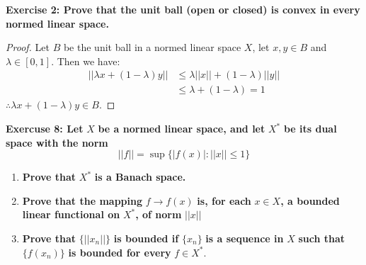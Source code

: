 \documentclass{article}
\theoremstyle{definition}
\theoremstyle{remark}
\theoremstyle{definition}
\begin{document}
    \textbf{Exercise 2: Prove that the unit ball (open or closed) is convex in every normed linear space.}
\begin{proof}
    Let $B$ be the unit ball in a normed linear space $X$, let $x,y\in B$ and $\lambda\in [0,1]$.
    Then we have:\begin{align}
        ||\lambda x+(1-\lambda)y|| &\leq \lambda ||x|| + (1-\lambda)||y||\\
        &\leq \lambda + (1-\lambda)  = 1
    \end{align}
    $\therefore \lambda x+(1-\lambda)y\in B$.

\end{proof}
    
    \textbf{Exercuse 8: Let }$X$\textbf{ be a normed linear space, and let }$X^\ast$\textbf{ be its dual space with the norm}\begin{equation*}
        ||f|| = \sup\{|f(x)| \colon ||x||\leq 1 \}
    \end{equation*}
    \begin{enumerate}[label = (\alph*)]
        \item \textbf{Prove that }$X^\ast$\textbf{ is a Banach space.}
        \item \textbf{Prove that the mapping }$f\rightarrow f(x)$ \textbf{ is, for each }$x\in X$\textbf{, a bounded linear functional on }
        $X^\ast$\textbf{, of norm }$||x||$
        \item \textbf{Prove that }$\{||x_n||\}$ \textbf{is bounded if }$\{x_n\}$\textbf{ is a sequence in }$X$\textbf{ such that }$\{f(x_n)\}$ \textbf{ is bounded for every }$f\in X^\ast$.
    \end{enumerate}
\end{document}
